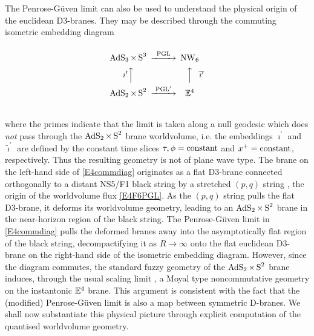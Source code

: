 The Penrose-G\"uven limit can also be used to understand the physical origin of
the euclidean D3-branes. They may be described through the commuting isometric
embedding diagram
\begin{equation}
  \label{E4commdiag}
  \begin{CD}
   @.\\
    \AdS_3 \times \S^3             @>\text{PGL}>> \NW_6\\
    \text{$\imath^{ \prime}  $}@AAA
@AAA\text{$\widetilde{\imath}^{ \prime}$}\\
    \AdS_2 \times \S^2             @>\text{PGL$^{ \prime}$}>> \E^4\\
   @.
  \end{CD}
\end{equation}
where the primes indicate that the limit is taken along a null geodesic which
does {\it not} pass through the $\operatorname{AdS}_2\times\operatorname{S}^2$ brane worldvolume, i.e. the
embeddings $\imath^{ \prime}$ and $\widetilde{\imath}^{ \prime}$ are defined by
the constant time slices $\tau,\phi={\rm constant}$ and $x^+={\rm constant}$,
respectively. Thus the resulting geometry is not of plane wave type. The brane
on the left-hand side of \eqref{E4commdiag} originates as a flat D3-brane
connected orthogonally to a distant NS5/F1 black string by a stretched $(p,q)$
string \cite{BP1}, the origin of the worldvolume flux \eqref{E4F6PGL}. As the
$(p,q)$ string pulls the flat D3-brane, it deforms its worldvolume geometry,
leading to an $\operatorname{AdS}_2\times\operatorname{S}^2$ brane in the near-horizon region of the black
string. The Penrose-G\"uven limit in \eqref{E4commdiag} pulls the deformed
branes away into the asymptotically flat region of the black string,
decompactifying it as $R\to\infty$ onto the flat euclidean D3-brane on the
right-hand side of the isometric embedding diagram. However, since the diagram
commutes, the standard fuzzy geometry of the $\operatorname{AdS}_2\times\operatorname{S}^2$ brane induces,
through the usual scaling limit \cite{CMS1}, a Moyal type noncommutative
geometry on the instantonic ${\mathbb E}^4$ brane. This argument is consistent with
the fact that the (modified) Penrose-G\"uven limit is also a map between
symmetric D-branes. We shall now substantiate this physical picture through
explicit computation of the quantised worldvolume geometry.

